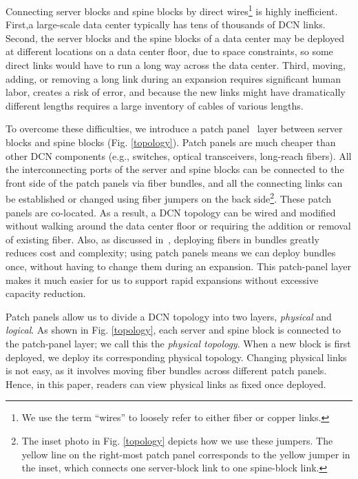 \documentclass[letterpaper,twocolumn,10pt]{article}
\begin{document}
Connecting server blocks and spine blocks by direct wires\footnote{We use the term ``wires'' to loosely refer to either fiber or copper links.} is highly inefficient. First,a large-scale data center typically has tens of thousands of DCN links. Second, the server blocks and the spine blocks of a data center may be deployed at different locations on a data center floor, due to space constraints, so some direct links would have to run a long way across the data center. Third, moving, adding, or removing a long link during an expansion requires significant human labor, creates a risk of error, and because the new links might have dramatically different lengths requires a large inventory of cables of various lengths.

To overcome these difficulties, we introduce a patch panel~\cite{PatchPanel, PatchPanelCabling} layer between server blocks and spine blocks (Fig. \ref{topology}). Patch panels are much cheaper than other DCN components (e.g., switches, optical transceivers, long-reach fibers). All the interconnecting ports of the server and spine blocks can be connected to the front side of the patch panels via fiber bundles, and all the connecting links can be established or changed using fiber jumpers on the back side\footnote{The inset photo in Fig. \ref{topology} depicts how we use these jumpers.  The yellow line on the right-most patch panel corresponds to the yellow jumper in the inset, which connects one server-block link to one spine-block link.}. These patch panels are co-located. As a result, a DCN topology can be wired and modified without walking around the data center floor or requiring the addition or removal of existing fiber.  Also, as discussed in~\cite{JupiterRising}, deploying fibers in bundles greatly reduces cost and complexity; using patch panels means we can deploy bundles once, without having to change them during an expansion. This patch-panel layer makes it much easier for us to support rapid expansions without excessive capacity reduction.


Patch panels allow us to divide a DCN topology into two layers, \emph{physical} and \emph{logical}. As shown in Fig. \ref{topology}, each server and spine block is connected to the patch-panel layer; we call this the \emph{physical topology}. When a new block is first deployed, we deploy its corresponding physical topology. Changing physical links is not easy, as it involves moving fiber bundles across different patch panels. Hence, in this paper, readers can view physical links as fixed once deployed. 
\end{document}
